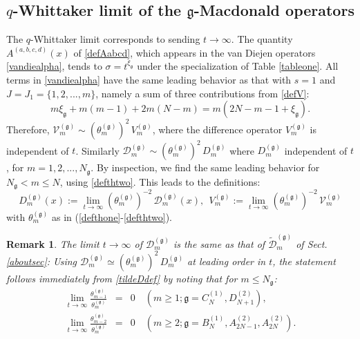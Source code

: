 \documentclass[12pt]{amsart}
\newtheorem{remark}[thm]{Remark}
\newcommand{\g}{{\mathfrak{g}}}
\numberwithin{equation}{section}
\begin{document}
\subsection{$q$-Whittaker limit of the $\g$-Macdonald operators}
\label{appqwhit}
%
The $q$-Whittaker limit corresponds to sending $t\to \infty$. 
%
%
%
%
The quantity $A^{(a,b,c,d)}(x)$ of \eqref{defAabcd}, which appears in the van Diejen operators \eqref{vandiealpha}, tends to $\sigma = t^{\xi_\g}$ under the specialization of Table \ref{tableone}.
All terms in \eqref{vandiealpha} have the same leading behavior as that with
$s=1$ and $J=J_1=\{1,2,...,m\}$, namely a sum of three contributions from \eqref{defV}:
$$ m \xi_\g + m(m-1) + 2 m(N-m)=m(2N-m-1+\xi_\g). $$
%
Therefore, ${\mathcal V}_m^{(\g)} \sim (\theta_m^{(\g)})^2\, V_m^{(\g)}$, where the difference operator
$V_m^{(\g)}$ is independent of $t$. Similarly ${\mathcal D}_m^{(\g)}\sim (\theta_m^{(\g)})^2\, D_m^{(\g)}$
where $D_m^{(\g)}$ independent of $t$, for $m=1,2,...,N_\g$. By inspection, 
we find the same leading behavior for $N_\g<m\leq N$, using \eqref{defthtwo}. This leads to the definitions:
%
%
\begin{equation}\label{DlimW}D_m^{(\g)}(x):=\lim_{t\to \infty} (\theta_m^{(\g)})^{-2} \,{\mathcal D}_m^{(\g)}(x),\ \ V_m^{(\g)}:=\lim_{t\to\infty}  (\theta_m^{(\g)})^{-2}\, {\mathcal V}_m^{(\g)}\end{equation}
with $\theta_m^{(\g)}$ as in (\ref{defthone}-\ref{defthtwo}).
%

\begin{remark}\label{limDrem}
The limit $t\to \infty$ 
of ${\mathcal D}^{(\g)}_m$ is the {\it same} as that of $\tilde{\mathcal D}^{(\g)}_m$ of Sect. \ref{aboutsec}:
Using ${\mathcal D}^{(\g)}_m\simeq (\theta_m^{(\g)})^{2}\, {D}^{(\g)}_m$ at leading order in $t$,
the statement follows immediately from \eqref{tildeDdef} by noting that for $m\leq N_\g$:
\begin{eqnarray*}
\lim_{t\to\infty} \frac{\theta_{m-1}^{(\g)}}{\theta_{m}^{(\g)}}&=&0 \quad (m\geq 1;\g=C_N^{(1)},D_{N+1}^{(2)}),\\
\lim_{t\to\infty} \frac{\theta_{m-2}^{(\g)}}{\theta_{m}^{(\g)}}&=&0 \quad (m\geq 2;\g=B_N^{(1)},A_{2N-1}^{(2)},A_{2N}^{(2)}).
\end{eqnarray*}
\end{remark}
\end{document}
